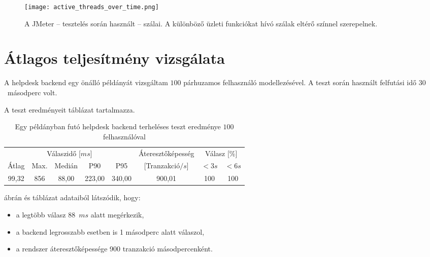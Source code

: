 \begin{figure}[hbt] 
	\centering
	\texttt{[image: active\_threads\_over\_time.png]}
	\caption[A JMeter tesztelés során használt --   szálai]{A JMeter --  tesztelés során használt --   szálai. A különböző üzleti funkciókat hívó szálak eltérő színnel szerepelnek.}
	\label{fig:active_threads_over_time}
\end{figure}



\section{Átlagos teljesítmény vizsgálata}
A helpdesk backend egy önálló példányát vizsgáltam $100$ párhuzamos felhasználó modellezésével. A teszt során használt felfutási idő $30$~másodperc volt.

A teszt eredményeit  táblázat tartalmazza.

\begin{table}[hbt]
	
	\begin{tabular}{ccccc|c|cc}
		\multicolumn{5}{c|}{Válaszidő [$ms$]}  & Áteresztőképesség & \multicolumn{2}{c}{Válasz [\%]}	\\
		Átlag & Max. & Medián & P90 & P95 &	[Tranzakció$/s$] & $<3s$& $<6s$ \\
		\hline 
		99,32 & 856 & 88,00 & 223,00 & 340,00 & 900,01 & 100 & 100 \\
	\end{tabular} 
	
	\caption{Egy példányban futó helpdesk backend terheléses teszt eredménye $100$ felhasználóval}
	\label{tabl:1_instance_100_user}
\end{table}

 ábrán és  táblázat adataiból látszódik, hogy:
\begin{itemize}
	\item a legtöbb válasz 88~$ms$ alatt megérkezik,
	\item a backend legrosszabb esetben is 1 másodperc alatt válaszol,
	\item a rendszer áteresztőképessége 900 tranzakció másodpercenként.
\end{itemize}


